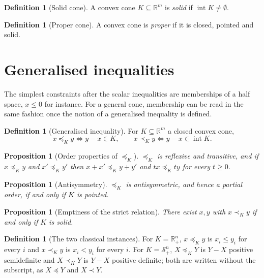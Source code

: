 \documentclass[a4paper,11pt]{book}
\theoremstyle{plain}
\newtheorem{proposition}[theorem]{Proposition}
\theoremstyle{definition}
\newtheorem{definition}[theorem]{Definition}
\theoremstyle{remark}
\numberwithin{equation}{chapter}
\numberwithin{algorithm}{chapter}
\newcommand{\R}{\mathbb{R}}
\newcommand{\Sp}{\mathcal{S}}
\newcommand{\intr}{\operatorname{int}}
\begin{document}
	\begin{definition}[Solid cone]
		A convex cone $K\subseteq\R^m$ is \emph{solid} if $\intr K\neq\emptyset$.
	\end{definition}
	
	\begin{definition}[Proper cone]
		A convex cone is \emph{proper} if it is closed, pointed and solid.
	\end{definition}
	
	\section{Generalised inequalities}
	
	The simplest constraints after the scalar inequalities are memberships of a
	half space, $x\leq0$ for instance. For a general cone, membership can be read
	in the same fashion once the notion of a generalised inequality is defined.
	
	\begin{definition}[Generalised inequality]
		For $K\subseteq\R^m$ a closed convex cone,
		\begin{equation}
			x\preceq_K y\iff y-x\in K,
			\qquad
			x\prec_K y\iff y-x\in\intr K .
		\end{equation}
	\end{definition}
	
	\begin{proposition}[Order properties of $\preceq_K$]
		$\preceq_K$ is reflexive and transitive, and if $x\preceq_Ky$ and
		$x'\preceq_Ky'$ then $x+x'\preceq_Ky+y'$ and $tx\preceq_Kty$ for every
		$t\geq0$.
	\end{proposition}
	
	
	\begin{proposition}[Antisymmetry]
		$\preceq_K$ is antisymmetric, and hence a partial order, if and only if $K$ is
		pointed.
	\end{proposition}
	
	\begin{proposition}[Emptiness of the strict relation]
		There exist $x,y$ with $x\prec_Ky$ if and only if $K$ is solid.
	\end{proposition}
	
	\begin{definition}[The two classical instances]
		For $K=\R^n_+$, $x\preceq_Ky$ is $x_i\leq y_i$ for every $i$ and $x\prec_Ky$ is
		$x_i<y_i$ for every $i$. For $K=\Sp^n_+$, $X\preceq_KY$ is $Y-X$ positive
		semidefinite and $X\prec_KY$ is $Y-X$ positive definite; both are written
		without the subscript, as $X\preceq Y$ and $X\prec Y$.
	\end{definition}
	
\end{document}
